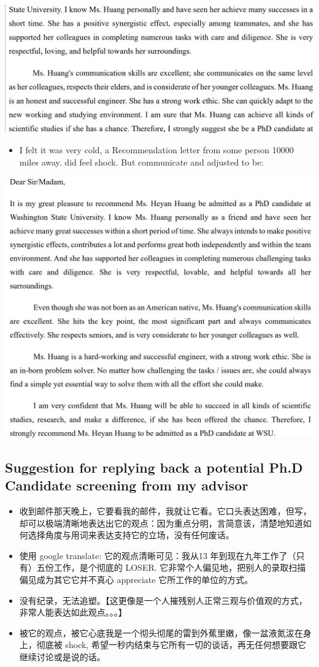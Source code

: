\documentclass[9pt, b5paper]{article}
\begin{document}
\includegraphics[width=.9\linewidth]{./pic/readme2_20230329_114352.png}
\begin{itemize}
\item I felt it was very cold, a Recommendation letter from some person 10000 miles away. did feel shock. But communicate and adjusted to be:
\end{itemize}

\includegraphics[width=.9\linewidth]{./pic/readme2_20230329_092732.png}
\subsection{Suggestion for replying back a potential Ph.D Candidate screening from my advisor}
\label{sec-5-2}
\begin{itemize}
\item 收到邮件那天晚上，它要看我的邮件，我就让它看。它口头表达困难，但写，却可以极端清晰地表达出它的观点：因为重点分明，言简意该，清楚地知道如何选择角度与用词来表达支持它的立场，没有任何废话。
\item 使用 google translate: 它的观点清晰可见：我从13 年到现在九年工作了（只有）五份工作，是个彻底的 LOSER. 它非常个人偏见地，把别人的录取扫描偏见成为其它它并不真心 appreciate 它所工作的单位的方式。
\item 没有纪录，无法追塑。【这更像是一个人摧残别人正常三观与价值观的方式，非常人能表达如此观点。。。】
\item 被它的观点，被它心底我是一个彻头彻尾的雷到外蕉里嫩，像一盆液氮沷在身上，彻底被 shock, 希望一秒内结束与它所有一切的谈话，再无任何想要跟它继续讨论或是说的话。
\end{itemize}
\end{document}
